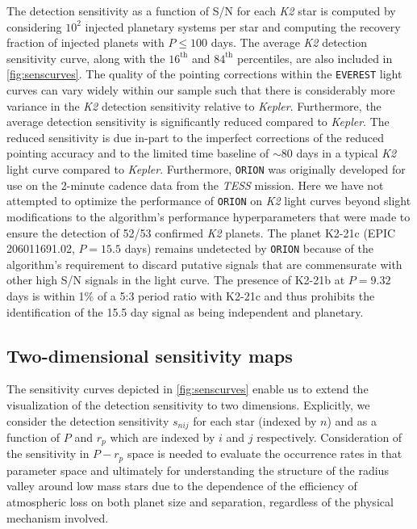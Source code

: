 \documentclass[twocolumn]{emulateapj}
\newcommand{\kepler}[1]{\emph{Kepler}#1}
\newcommand{\ktwo}[1]{\emph{K2}#1}
\newcommand{\tess}[1]{\emph{TESS}#1}
\begin{document}
The detection sensitivity as a function of S/N for each \ktwo{} star is computed by considering
$10^2$ injected planetary systems per star and computing the recovery fraction of injected planets with
$P \leq 100$ days. The average \ktwo{} detection sensitivity curve, along with the
$16^{\text{th}}$ and $84^{\text{th}}$ percentiles, are also included in \autoref{fig:senscurves}. The quality
of the pointing corrections within the \texttt{EVEREST} light curves can vary widely within our sample such
that there is considerably more variance in the \ktwo{} detection sensitivity relative to \kepler{.} Furthermore,
the average detection sensitivity is significantly reduced compared to \kepler{.} %
The reduced sensitivity is due in-part to the imperfect corrections of the reduced pointing accuracy and
to the limited time baseline of $\sim 80$ days in a typical \ktwo{} light curve compared to \kepler{.} 
Furthermore, \texttt{ORION} was originally developed for use on the 2-minute cadence data
from the \tess{} mission. Here
we have not attempted to optimize the performance of \texttt{ORION} on \ktwo{} light curves 
beyond slight modifications to the algorithm's performance hyperparameters that were made to ensure the
detection of 52/53 confirmed \ktwo{} planets. The planet K2-21c (EPIC 206011691.02, $P=15.5$ days)
remains undetected by \texttt{ORION} because of the algorithm's requirement to discard putative signals
that are commensurate with other high S/N signals in the light curve. The presence of K2-21b at $P=9.32$ days
is within 1\% of a 5:3 period ratio with K2-21c and thus prohibits the identification of the 15.5 day signal
as being independent and planetary.


\subsection{Two-dimensional sensitivity maps}
The sensitivity curves depicted in \autoref{fig:senscurves} enable us to extend the visualization of the
detection sensitivity to two dimensions. Explicitly, we consider the detection sensitivity
$s_{nij}$ for each star (indexed by $n$) and as a function of $P$ and $r_p$ which are indexed by $i$ and
$j$ respectively. Consideration of the sensitivity in $P-r_p$ space is needed to evaluate the
occurrence rates in that parameter space and ultimately for understanding the structure of
the radius valley around low mass stars due to the dependence of the efficiency of atmospheric loss on
both planet size and separation, regardless of the physical mechanism involved. 
\end{document}

